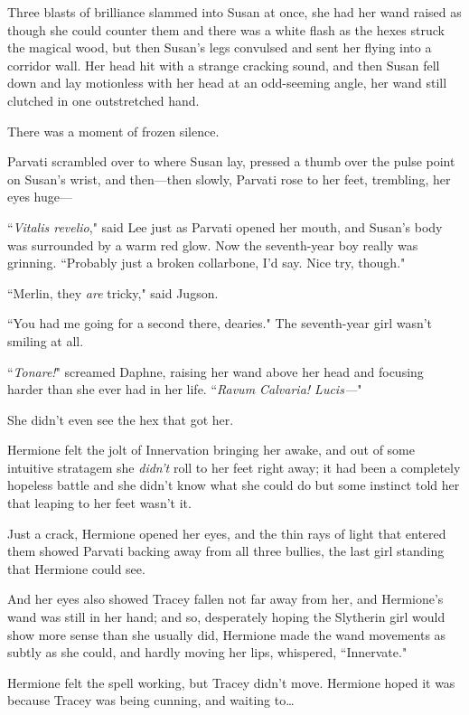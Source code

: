 Three blasts of brilliance slammed into Susan at once, she had her wand raised as though she could counter them and there was a white flash as the hexes struck the magical wood, but then Susan's legs convulsed and sent her flying into a corridor wall. Her head hit with a strange cracking sound, and then Susan fell down and lay motionless with her head at an odd-seeming angle, her wand still clutched in one outstretched hand.

There was a moment of frozen silence.

Parvati scrambled over to where Susan lay, pressed a thumb over the pulse point on Susan's wrist, and then—then slowly, Parvati rose to her feet, trembling, her eyes huge—

``\emph{Vitalis revelio}," said Lee just as Parvati opened her mouth, and Susan's body was surrounded by a warm red glow. Now the seventh-year boy really was grinning. ``Probably just a broken collarbone, I'd say. Nice try, though."

``Merlin, they \emph{are} tricky," said Jugson.

``You had me going for a second there, dearies." The seventh-year girl wasn't smiling at all.

``\emph{Tonare!}" screamed Daphne, raising her wand above her head and focusing harder than she ever had in her life. ``\emph{Ravum Calvaria! Lucis—}"

She didn't even see the hex that got her.

\later

Hermione felt the jolt of Innervation bringing her awake, and out of some intuitive stratagem she \emph{didn't} roll to her feet right away; it had been a completely hopeless battle and she didn't know what she could do but some instinct told her that leaping to her feet wasn't it.

Just a crack, Hermione opened her eyes, and the thin rays of light that entered them showed Parvati backing away from all three bullies, the last girl standing that Hermione could see.

And her eyes also showed Tracey fallen not far away from her, and Hermione's wand was still in her hand; and so, desperately hoping the Slytherin girl would show more sense than she usually did, Hermione made the wand movements as subtly as she could, and hardly moving her lips, whispered, ``Innervate."

Hermione felt the spell working, but Tracey didn't move. Hermione hoped it was because Tracey was being cunning, and waiting to{\ldots}

